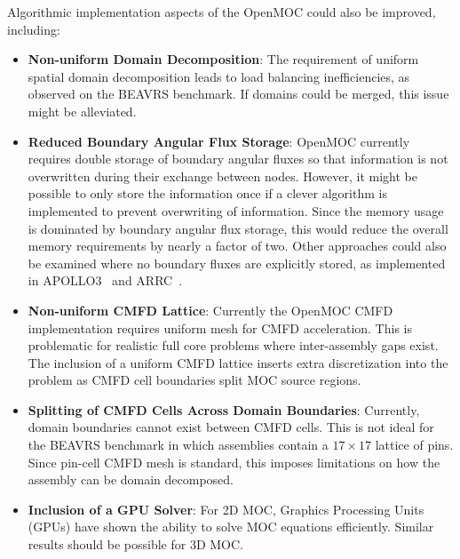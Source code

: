 Algorithmic implementation aspects of the OpenMOC could also be improved, including:

\begin{itemize}
	\item \textbf{Non-uniform Domain Decomposition}: The requirement of uniform spatial domain decomposition leads to load balancing inefficiencies, as observed on the BEAVRS benchmark. If domains could be merged, this issue might be alleviated.
	
	\item \textbf{Reduced Boundary Angular Flux Storage}: OpenMOC currently requires double storage of boundary angular fluxes so that information is not overwritten during their exchange between nodes. However, it might be possible to only store the information once if a clever algorithm is implemented to prevent overwriting of information. Since the memory usage is dominated by boundary angular flux storage, this would reduce the overall memory requirements by nearly a factor of two. Other approaches could also be examined where no boundary fluxes are explicitly stored, as implemented in APOLLO3~\cite{apollo3_exp} and ARRC~\cite{trrm_new}.
	
	\item \textbf{Non-uniform \ac{CMFD} Lattice}: Currently the OpenMOC \ac{CMFD} implementation requires uniform mesh for \ac{CMFD} acceleration. This is problematic for realistic full core problems where inter-assembly gaps exist. The inclusion of a uniform \ac{CMFD} lattice inserts extra discretization into the problem as \ac{CMFD} cell boundaries split \ac{MOC} source regions.
	
	\item \textbf{Splitting of \ac{CMFD} Cells Across Domain Boundaries}: Currently, domain boundaries cannot exist between \ac{CMFD} cells. This is not ideal for the BEAVRS benchmark in which assemblies contain a $17 \times 17$ lattice of pins. Since pin-cell \ac{CMFD} mesh is standard, this imposes limitations on how the assembly can be domain decomposed. 
	
	
	
	\item \textbf{Inclusion of a GPU Solver}: For 2D \ac{MOC}, Graphics Processing Units (GPUs) have shown the ability to solve \ac{MOC} equations efficiently. Similar results should be possible for 3D \ac{MOC}. 
\end{itemize}


